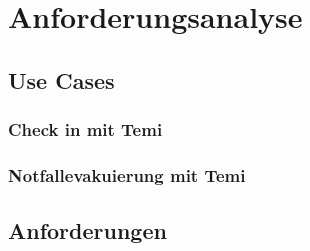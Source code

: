 \chapter{Anforderungsanalyse}
\label{chap:anforderungsanalyse}
\section{Use Cases}
\subsection{Check in mit Temi}
\subsection{Notfallevakuierung mit Temi}
\section{Anforderungen}
